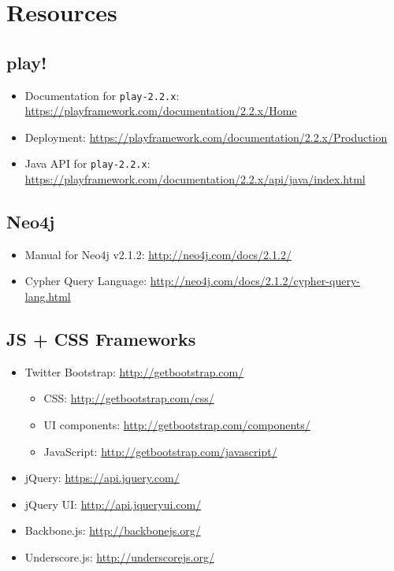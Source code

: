 \documentclass[11pt]{article}
\begin{document}
\section{Resources}
\label{sec-4}
\subsection{play!}
\label{sec-4-1}
\begin{itemize}
\item Documentation for \texttt{play-2.2.x}:
\url{https://playframework.com/documentation/2.2.x/Home}
\item Deployment:
\url{https://playframework.com/documentation/2.2.x/Production}
\item Java API for \texttt{play-2.2.x}:
\url{https://playframework.com/documentation/2.2.x/api/java/index.html}
\end{itemize}

\subsection{Neo4j}
\label{sec-4-2}
\begin{itemize}
\item Manual for Neo4j v2.1.2:
\url{http://neo4j.com/docs/2.1.2/}
\item Cypher Query Language:
\url{http://neo4j.com/docs/2.1.2/cypher-query-lang.html}
\end{itemize}

\subsection{JS + CSS Frameworks}
\label{sec-4-3}
\begin{itemize}
\item Twitter Bootstrap: \url{http://getbootstrap.com/}
\begin{itemize}
\item CSS: \url{http://getbootstrap.com/css/}
\item UI components: \url{http://getbootstrap.com/components/}
\item JavaScript: \url{http://getbootstrap.com/javascript/}
\end{itemize}
\item jQuery: \url{https://api.jquery.com/}
\item jQuery UI: \url{http://api.jqueryui.com/}
\item Backbone.js: \url{http://backbonejs.org/}
\item Underscore.js: \url{http://underscorejs.org/}
\end{itemize}
\end{document}
